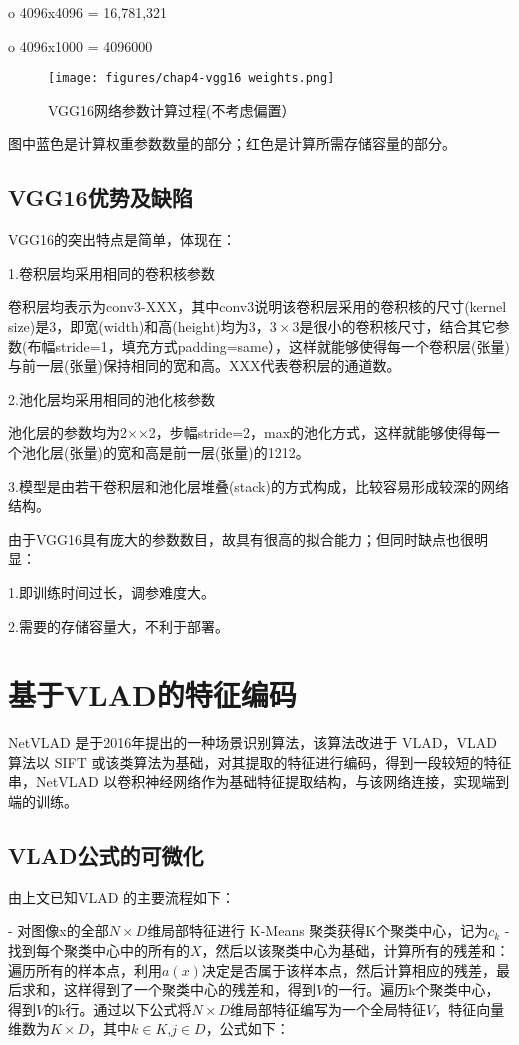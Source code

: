 o	4096x4096 = 16,781,321

o	4096x1000 = 4096000

\begin{figure}[htbp]
	\centering
	\texttt{[image: figures/chap4-vgg16 weights.png]}
	\caption{VGG16网络参数计算过程(不考虑偏置）}
\end{figure}

图中蓝色是计算权重参数数量的部分；红色是计算所需存储容量的部分。

\subsection{VGG16优势及缺陷}
VGG16的突出特点是简单，体现在：

1.卷积层均采用相同的卷积核参数

卷积层均表示为conv3-XXX，其中conv3说明该卷积层采用的卷积核的尺寸(kernel size)是3，即宽(width)和高(height)均为3，$3\times3$是很小的卷积核尺寸，结合其它参数(布幅stride=1，填充方式padding=same），这样就能够使得每一个卷积层(张量)与前一层(张量)保持相同的宽和高。XXX代表卷积层的通道数。

2.池化层均采用相同的池化核参数

池化层的参数均为2××2，步幅stride=2，max的池化方式，这样就能够使得每一个池化层(张量)的宽和高是前一层(张量)的1212。

3.模型是由若干卷积层和池化层堆叠(stack)的方式构成，比较容易形成较深的网络结构。

由于VGG16具有庞大的参数数目，故具有很高的拟合能力；但同时缺点也很明显：

1.即训练时间过长，调参难度大。

2.需要的存储容量大，不利于部署。


\section{基于VLAD的特征编码}
NetVLAD 是于2016年提出的一种场景识别算法，该算法改进于 VLAD，VLAD 算法以 SIFT 或该类算法为基础，对其提取的特征进行编码，得到一段较短的特征串，NetVLAD 以卷积神经网络作为基础特征提取结构，与该网络连接，实现端到端的训练。

\subsection{VLAD公式的可微化}
由上文已知VLAD 的主要流程如下：

- 对图像x的全部$N \times D$维局部特征进行 K-Means 聚类获得K个聚类中心，记为$c_k$
- 找到每个聚类中心中的所有的$X$，然后以该聚类中心为基础，计算所有的残差和：遍历所有的样本点，利用$a(x)$决定是否属于该样本点，然后计算相应的残差，最后求和，这样得到了一个聚类中心的残差和，得到$V$的一行。遍历k个聚类中心，得到$V$的k行。通过以下公式将$N \times D$维局部特征编写为一个全局特征$V$，特征向量维数为$K \times D$，其中$k\in K$,$j\in D$，公式如下：

